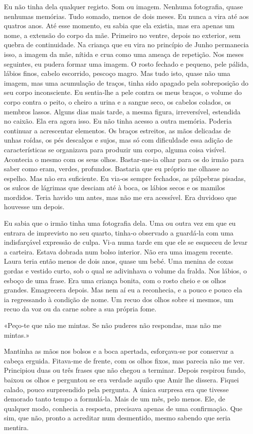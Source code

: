 Eu não tinha dela qualquer registo. Som ou imagem. Nenhuma fotografia,
quase nenhumas memórias. Tudo somado, menos de dois meses. Eu nunca a
vira até aos quatros anos. Até esse momento, eu sabia que ela existia,
mas era apenas um nome, a extensão do corpo da mãe. Primeiro no ventre,
depois no exterior, sem quebra de continuidade. Na criança que eu vira
no princípio de Junho permanecia isso, a imagem da mãe, nítida e crua
como uma ameaça de repetição. Nos meses seguintes, eu pudera formar uma
imagem. O rosto fechado e pequeno, pele pálida, lábios finos, cabelo
escorrido, pescoço magro. Mas tudo isto, quase não uma imagem, mas uma
acumulação de traços, tinha sido apagado pela sobreposição do seu corpo
inconsciente. Eu sentia­‑lhe a pele contra os meus braços, o volume do
corpo contra o peito, o cheiro a urina e a sangue seco, os cabelos
colados, os membros lassos. Alguns dias mais tarde, a mesma figura,
irreversível, estendida no caixão. Ela era agora isso. Eu não tinha
acesso a outra memória. Poderia continuar a acrescentar elementos. Os
braços estreitos, as mãos delicadas de unhas roídas, os pés descalços e
sujos, mas só com dificuldade essa adição de características se
organizava para produzir um corpo, alguma coisa visível. Acontecia o
mesmo com os seus olhos. Bastar­‑me­‑ia olhar para os do irmão para
saber como eram, verdes, profundos. Bastaria que eu próprio me olhasse
ao espelho. Mas não era suficiente. Eu via­‑os sempre fechados, as
pálpebras pisadas, os sulcos de lágrimas que desciam até à boca, os
lábios secos e os mamilos mordidos. Teria havido um antes, mas não me
era acessível. Era duvidoso que houvesse um depois.

Eu sabia que o irmão tinha uma fotografia dela. Uma ou outra vez em que
eu entrara de imprevisto no seu quarto, tinha­‑o observado a guardá­‑la
com uma indisfarçável expressão de culpa. Vi­‑a numa tarde em que ele se
esqueceu de levar a carteira. Estava dobrada num bolso interior. Não era
uma imagem recente. Laura teria então menos de dois anos, quase um bebé.
Uma menina de coxas gordas e vestido curto, sob o qual se adivinhava o
volume da fralda. Nos lábios, o esboço de uma frase. Era uma criança
bonita, com o rosto cheio e os olhos grandes. Emagrecera depois. Mas nem
aí eu a reconhecia, e a pouco e pouco ela ia regressando à condição de
nome. Um recuo dos olhos sobre si mesmos, um recuo da voz ou da carne
sobre a sua própria fome.

«Peço­‑te que não me mintas. Se não puderes não respondas, mas não me
mintas.»

Mantinha as mãos nos bolsos e a boca apertada, esforçava­‑se por
conservar a cabeça erguida. Fitava­‑me de frente, com os olhos fixos,
mas parecia não me ver. Principiou duas ou três frases que não chegou a
terminar. Depois respirou fundo, baixou os olhos e perguntou se era
verdade aquilo que Amir lhe dissera. Fiquei calado, pouco surpreendido
pela pergunta. A única surpresa era que tivesse demorado tanto tempo a
formulá­‑la. Mais de um mês, pelo menos. Ele, de qualquer modo, conhecia
a resposta, precisava apenas de uma confirmação. Que sim, que não,
pronto a acreditar num desmentido, mesmo sabendo que seria mentira.

